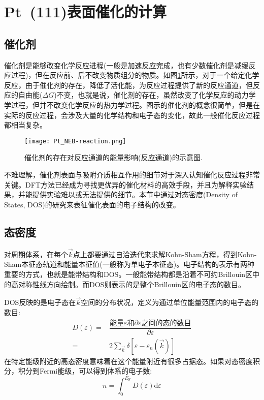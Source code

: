 \section{Pt~(111)表面催化的计算}
\subsection{催化剂}
催化剂是能够改变化学反应进程(一般是加速反应完成，也有少数催化剂是减缓反应过程)，但在反应前、后不改变物质组分的物质。如图\ref{Pt_NEB-reaction}所示，对于一个给定化学反应，由于催化剂的存在，降低了活化能，为反应过程提供了新的反应通道，但反应的自由能($\Delta G$)不变，也就是说，催化剂的存在，虽然改变了化学反应的动力学学过程，但并不改变化学反应的热力学过程。图示的催化剂的概念很简单，但是在实际的反应过程，会涉及大量的化学结构和电子态的变化，故此一般催化反应过程都相当复杂。
\begin{figure}[h!]
\centering
\texttt{[image: Pt\_NEB-reaction.png]}
\caption{\small 催化剂的存在对反应通道的能量影响(反应通道)的示意图.}%
\label{Pt_NEB-reaction}
\end{figure} 

不难理解，催化剂表面与吸附介质相互作用的细节对于深入认知催化反应过程非常关键。\textrm{DFT}方法已经成为寻找更优异的催化材料的高效手段，并且为解释实验结果，并能提供实验难以或无法提供的细节。本节中通过对态密度\textrm{(Density of States, DOS)}的研究来表征催化表面的电子结构的改变。
\subsection{态密度}
对周期体系，在每个$\vec k$点上都要通过自洽迭代来求解\textrm{Kohn-Sham}方程，得到\textrm{Kohn-Sham}本征态轨道和能量本征值(一般称为单电子本征态)。电子结构的表示有两种重要的方式，也就是能带结构和\textrm{DOS}。一般能带结构都是沿着不可约\textrm{Brillouin}区中的高对称性线方向绘制。而\textrm{DOS}则表示的是整个\textrm{Brillouin}区的电子态的数目。

\textrm{DOS}反映的是电子态在$\vec k$空间的分布状况，定义为通过单位能量范围内的电子态的数目:
\begin{equation}
	\begin{aligned}
		D(\varepsilon)=&\dfrac{\mbox{能量}\varepsilon\mbox{和}\partial\varepsilon\mbox{之间的态的数目}}{\partial\varepsilon}\\
		=&2\sum_{\vec k}\delta[\varepsilon-\varepsilon_n(\vec k)]
	\end{aligned}
	\label{eq:DOS}
\end{equation}
在特定能级附近的高态密度意味着在这个能量附近有很多占据态。如果对态密度积分，积分到\textrm{Fermi}能级，可以得到体系的电子数:~
\begin{equation}
	n=\int_0^{E_{\mathrm{F}}}D(\varepsilon)\mathrm{d}\varepsilon
	\label{eq:DOS-integral}
\end{equation}

